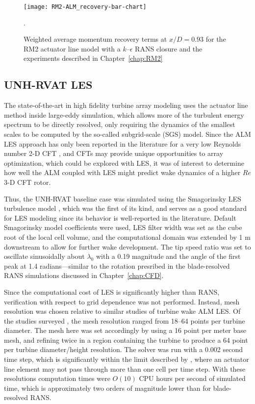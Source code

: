 \begin{figure}
    \centering
    
    \texttt{[image: RM2-ALM\_recovery-bar-chart]}
    
    \caption{Weighted average momentum recovery terms at $x/D=0.93$ for the RM2
        actuator line model with a $k$--$\epsilon$ RANS closure and the experiments
        described in Chapter~\ref{chap:RM2}}.
    
    \label{fig:RM2-ALM-recovery}
\end{figure}


\subsection{UNH-RVAT LES}

The state-of-the-art in high fidelity turbine array modeling uses the actuator
line method inside large-eddy simulation, which allows more of the turbulent
energy spectrum to be directly resolved, only requiring the dynamics of the
smallest scales to be computed by the so-called subgrid-scale (SGS) model. Since
the ALM LES approach has only been reported in the literature for a very low
Reynolds number 2-D CFT \cite{Shamsoddin2014}, and CFTs may provide unique
opportunities to array optimization, which could be explored with LES, it was of
interest to determine how well the ALM coupled with LES might predict wake
dynamics of a higher $Re$ 3-D CFT rotor.

Thus, the UNH-RVAT baseline case was simulated using the Smagorinsky LES
turbulence model \cite{Smagorinsky1963}, which was the first of its kind, and
serves as a good standard for LES modeling since its behavior is well-reported
in the literature. Default Smagorinsky model coefficients were used, LES filter
width was set as the cube root of the local cell volume, and the computational
domain was extended by 1 m downstream to allow for further wake development. The
tip speed ratio was set to oscillate sinusoidally about $\lambda_0$ with a 0.19
magnitude and the angle of the first peak at 1.4 radians---similar to the
rotation presribed in the blade-resolved RANS simulations discussed in
Chapter~\ref{chap:CFD}.

Since the computational cost of LES is significantly higher than RANS,
verification with respect to grid dependence was not performed. Instead, mesh
resolution was chosen relative to similar studies of turbine wake ALM LES. Of
the studies surveyed
\cite{Shamsoddin2014,Archer2013,Martinez-Tossas2015a,Troldborg2007}, the mesh
resolution ranged from 18--64 points per turbine diameter. The mesh here was set
accordingly by using a 16 point per meter base mesh, and refining twice in a
region containing the turbine to produce a 64 point per turbine diameter/height
resolution. The solver was run with a 0.002 second time step, which is
significantly within the limit described by \cite{Martinez-Tossas2015}, where an
actuator line element may not pass through more than one cell per time step.
With these resolutions computation times were $O(10)$ CPU hours per second of
simulated time, which is approximately two orders of magnitude lower than for
blade-resolved RANS.

